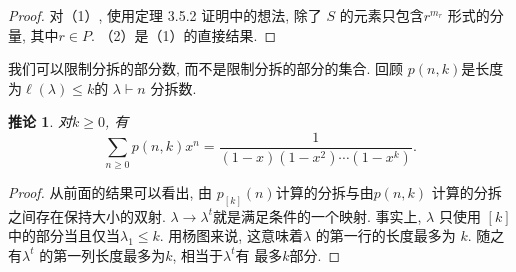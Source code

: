 \documentclass[a4paper,12pt]{ctexbook}
\newtheorem{corollary}[lemma]{\hspace{2em}推论}
\begin{document}
\begin{proof}
	对（1）, 使用定理 3.5.2 证明中的想法, 除了 $S$ 的元素只包含$r^{m_{r}}$ 形式的分量, 其中$r \in P$. （2）是（1）的直接结果.
\end{proof}

我们可以限制分拆的部分数, 而不是限制分拆的部分的集合. 回顾 $p(n, k)$是长度为$\ell(\lambda) \leq k$的  $\lambda \vdash n$ 分拆数.
\begin{corollary}
	对$k \geq 0$, 有$$
	\sum_{n \geq 0} p(n, k) x^{n}=\frac{1}{(1-x)\left(1-x^{2}\right) \cdots\left(1-x^{k}\right)}.
	$$
\end{corollary}
\begin{proof}
	从前面的结果可以看出, 由 $p_{[k]}(n)$计算的分拆与由$p(n, k)$ 计算的分拆之间存在保持大小的双射. $\lambda \rightarrow \lambda^{t}$就是满足条件的一个映射. 事实上, $\lambda$  只使用 $[k]$中的部分当且仅当$\lambda_{1} \leq k$. 用杨图来说, 这意味着$\lambda$ 的第一行的长度最多为 $k$. 随之有$\lambda^{t}$ 的第一列长度最多为$k$, 相当于$\lambda^{t}$有
	最多$k$部分.
\end{proof}
\end{document}
